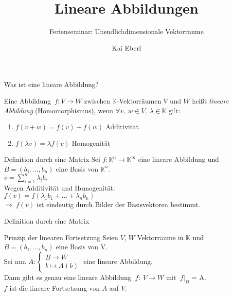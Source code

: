 \documentclass[AERbeamer%
,optBeamerClassicFormat%
,optLeftEquations   %
]{AERlatex}
\title{Lineare Abbildungen}%
\subtitle{Ferienseminar: Unendlichdimensionale Vektorräume}%
\author{Kai Eberl}%
\date{\AERutilsDate{5}{9}{2022}}%
\begin{document}
%
%
    \AERbeamerTitlePageDefault%
%
    \begin{frame}{Was ist eine lineare Abbildung?}%
        \begin{Definition}
            Eine Abbildung $~f: V \rightarrow W$ zwischen $\mathbb{K}$-Vektorräumen $V$ und $W$ heißt \emph{lineare Abbildung} (Homomorphismus), wenn $\forall v, ~ w \in V, ~ \lambda \in \mathbb{K}$ gilt: \\ \pause
            \begin{enumerate}
                [label=$(\roman*)$, leftmargin=2em]
                \item $f(v+w) = f(v) + f(w)$ \hspace{2em} Additivität \pause
                \item $f(\lambda v) = \lambda f(v)$ \hspace{6em} Homogenität
            \end{enumerate}
        \end{Definition}
    \end{frame}%
%
    \begin{frame}{Definition durch eine Matrix}
        \setlength{\baselineskip}{1.6\baselineskip}
%
        Sei $f: \mathbb{K}^n \rightarrow \mathbb{K}^m$ eine lineare Abbildung und $B=(b_1, \dots , b_n)$ eine Basis von $\mathbb{K}^n$. \\
        $v = \sum_{i=1}^n \lambda_i b_i$ \\ \pause
        Wegen Additivität und Homogenität: \\
        $f(v) = f(\lambda_1 b_1 + \dots + \lambda_n b_n)$ \\ \pause
        $\Rightarrow ~ f(v)$ ist eindeutig durch Bilder der Basisvektoren bestimmt.
    \end{frame}
%
    \begin{frame}{Definition durch eine Matrix}
        \setlength{\baselineskip}{1.6\baselineskip}
%
        \begin{block}{Prinzip der linearen Fortsetzung}
            Seien $V$, $W$ Vektorräume in $\mathbb{K}$ und $B=(b_1, \dots, b_n)$ eine Basis von V. \\
            Sei nun $A:\left\{\begin{array}{l}
                              B \rightarrow W \\ b \mapsto A(b)
            \end{array} \right.$ eine lineare Abbildung.                                         \\
            Dann gibt es genau eine lineare Abbildung $~ f: ~ V \rightarrow W$ mit $~ f|_B$ = A. \\
            $f$ ist die lineare Fortsetzung von $A$ auf $V$.
        \end{block}
    \end{frame}
\end{document}
